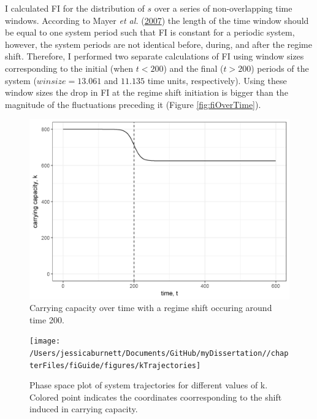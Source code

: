\documentclass[12pt,twoside,openany]{reedthesis}
\begin{document}
I calculated FI for the distribution of \(s\) over a series of non-overlapping time windows. According to Mayer \emph{et al.} (\protect\hyperlink{ref-mayer_applications_2007}{2007}) the length of the time window should be equal to one system period such that FI is constant for a periodic system, however, the system periods are not identical before, during, and after the regime shift. Therefore, I performed two separate calculations of FI using window sizes corresponding to the initial (when \(t<200\)) and the final (\(t>200\)) periods of the system (\(winsize = 13.061\) and \(11.135\) time units, respectively). Using these window sizes the drop in FI at the regime shift initiation is bigger than the magnitude of the fluctuations preceding it (Figure \ref{fig:fiOverTime}).
\begin{figure}
\includegraphics[width=0.95\linewidth]{./chapterFiles/fiGuide/figures/kByTime} \caption{Carrying capacity over time with a regime shift occuring around time 200.}\label{fig:kByTime}
\end{figure}
\begin{figure}
\texttt{[image: /Users/jessicaburnett/Documents/GitHub/myDissertation//chapterFiles/fiGuide/figures/kTrajectories]} \caption{Phase space plot of system trajectories for different values of k. Colored point indicates the coordinates coorresponding to the shift induced in carrying capacity. }\label{fig:kTrajectories}
\end{figure}
\end{document}

